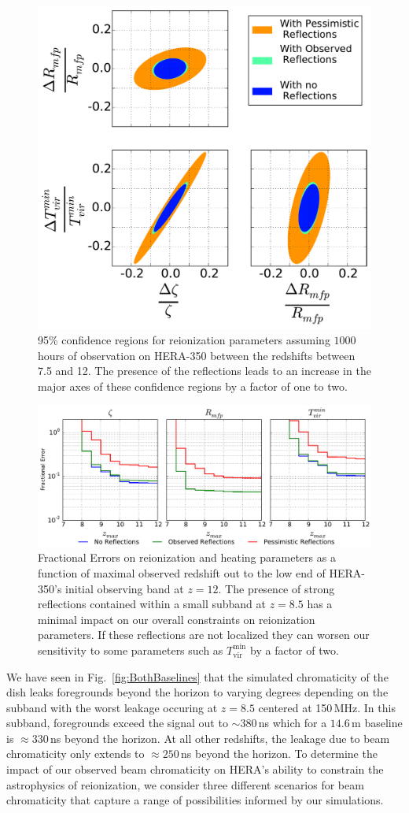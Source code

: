 \documentclass[twocolumn]{emulateapj}
\begin{document}
\begin{figure}[h!]
\includegraphics[width=.5\textwidth]{figures/reionization_triangle_compare_v2.pdf}
\caption{95\% confidence regions for reionization parameters assuming $1000$ hours of observation on HERA-350 between the redshifts between 7.5 and 12. The presence of the reflections leads to an increase in the major axes of these confidence regions by a factor of one to two.}
\label{fig:Confidence}
\end{figure}

\begin{figure}
\includegraphics[width=\textwidth]{figures/sigmaVsZ_reionization_v2.pdf}
\caption{Fractional Errors on reionization and heating parameters as a function of maximal observed redshift out to the low end of HERA-350's initial observing band at $z=12$. The presence of strong reflections contained within a small subband at $z=8.5$ has a minimal impact on our overall constraints on reionization parameters. If these reflections are not localized they can worsen our sensitivity to some parameters such as $T_\text{vir}^\text{min}$ by a factor of two.}
\label{fig:Errors}
\end{figure}

We have seen in Fig.~\ref{fig:BothBaselines} that the simulated chromaticity of the dish leaks foregrounds beyond the horizon to varying degrees depending on the subband with the worst leakage occuring at $z=8.5$ centered at 150\,MHz. In this subband, foregrounds exceed the signal out to $\sim 380$\,ns which for a $14.6$\,m baseline is $\approx 330$\,ns beyond the horizon. At all other redshifts, the leakage due to beam chromaticity only extends to $\approx 250$\,ns beyond the horizon. To determine the impact of our observed beam chromaticity on HERA's ability to constrain the astrophysics of reionization, we consider three different scenarios for beam chromaticity that capture a range of possibilities informed by our simulations. 
\end{document}
